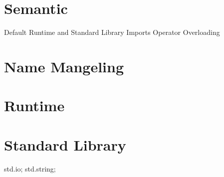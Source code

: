 \documentclass[a4paper]{article}
\begin{document}
\section{Semantic}
Default Runtime and Standard Library Imports
Operator Overloading

\section{Name Mangeling}

\section{Runtime}

\section{Standard Library}
std.io;
std.string;
\end{document}
